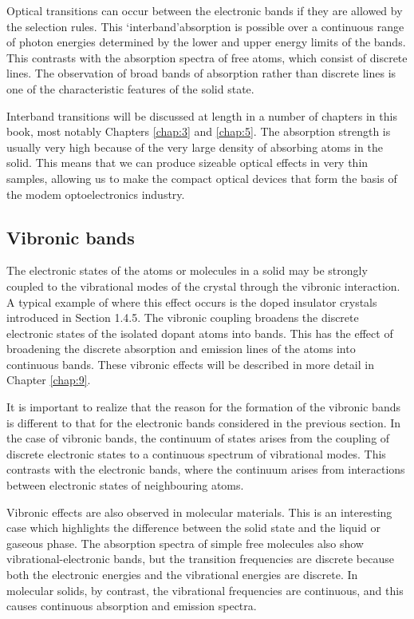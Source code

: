 \documentclass[12pt]{book}
\begin{document}
Optical transitions can occur between the electronic bands if they are allowed by the selection rules. This \lq interband\rq absorption is possible over a continuous range of photon energies determined by the lower and upper energy limits of the bands. This contrasts with the absorption spectra of free atoms, which consist of discrete lines. The observation of broad bands of absorption rather than discrete lines is one of the characteristic features of the solid state.

Interband transitions will be discussed at length in a number of chapters in this book, most notably Chapters \ref{chap:3} and \ref{chap:5}. The absorption strength is usually very high because of the very large density of absorbing atoms in the solid. This means that we can produce sizeable optical effects in very thin samples, allowing us to make the compact optical devices that form the basis of the modem optoelectronics industry.

\subsection{Vibronic bands}

The electronic states of the atoms or molecules in a solid may be strongly coupled to the vibrational modes of the crystal through the vibronic interaction. A typical example of where this effect occurs is the doped insulator crystals introduced in Section 1.4.5. The vibronic coupling broadens the discrete electronic states of the isolated dopant atoms into bands. This has the effect of broadening the discrete absorption and emission lines of the atoms into continuous bands. These vibronic effects will be described in more detail in Chapter \ref{chap:9}.

It is important to realize that the reason for the formation of the vibronic bands is different to that for the electronic bands considered in the previous section. In the case of vibronic bands, the continuum of states arises from the coupling of discrete electronic states to a continuous spectrum of vibrational modes. This contrasts with the electronic bands, where the continuum arises from interactions between electronic states of neighbouring atoms.

Vibronic effects are also observed in molecular materials. This is an interesting case which highlights the difference between the solid state and the liquid or gaseous phase. The absorption spectra of simple free molecules also show vibrational-electronic bands, but the transition frequencies are discrete because both the electronic energies and the vibrational energies are discrete.  In molecular solids, by contrast, the vibrational frequencies are continuous, and this causes continuous absorption and emission spectra.
\end{document}
